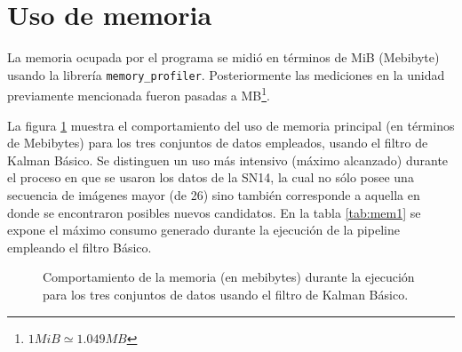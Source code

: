 \section{Uso de memoria}

La memoria ocupada por el programa se midi\'o en t\'erminos de MiB (Mebibyte) usando la librer\'ia \texttt{memory\_profiler}. Posteriormente las mediciones en la unidad previamente mencionada fueron pasadas a MB\footnote{$1MiB\simeq 1.049MB$ }.
\bigskip

La figura \ref{fig:mem_kbf} muestra el comportamiento del uso de memoria principal (en t\'erminos de Mebibytes) para los tres conjuntos de datos empleados, usando el filtro de Kalman B\'asico. Se distinguen un uso m\'as intensivo (m\'aximo alcanzado) durante el proceso en que se usaron los datos de la SN14, la cual no s\'olo posee una secuencia de im\'agenes mayor (de 26) sino tambi\'en corresponde a aquella en donde se encontraron posibles nuevos candidatos. En la tabla \ref{tab:mem1} se expone el m\'aximo consumo generado durante la ejecuci\'on de la pipeline empleando el filtro B\'asico.
\bigskip

\begin{figure}[h!]
\centering
{}\hfill
{}\vfill
{}
\caption{Comportamiento de la memoria (en mebibytes) durante la ejecuci\'on para los tres conjuntos de datos usando el filtro de Kalman B\'asico.}
\label{fig:mem_kbf}
\end{figure}

